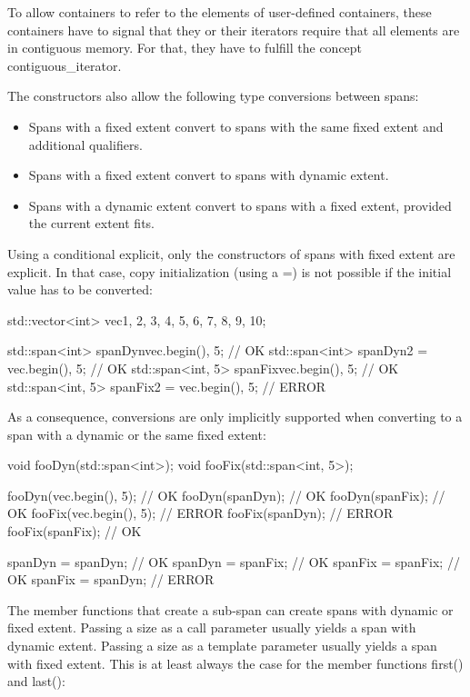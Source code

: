 To allow containers to refer to the elements of user-defined containers, these containers have to signal that they or their iterators require that all elements are in contiguous memory. For that, they have to fulfill the concept contiguous\_iterator.

The constructors also allow the following type conversions between spans:

\begin{itemize}
\item
Spans with a fixed extent convert to spans with the same fixed extent and additional qualifiers.

\item
Spans with a fixed extent convert to spans with dynamic extent.

\item
Spans with a dynamic extent convert to spans with a fixed extent, provided the current extent fits.
\end{itemize}

Using a conditional explicit, only the constructors of spans with fixed extent are explicit. In that case, copy initialization (using a =) is not possible if the initial value has to be converted:

\begin{cpp}
std::vector<int> vec{1, 2, 3, 4, 5, 6, 7, 8, 9, 10};

std::span<int> spanDyn{vec.begin(), 5}; // OK
std::span<int> spanDyn2 = {vec.begin(), 5}; // OK
std::span<int, 5> spanFix{vec.begin(), 5}; // OK
std::span<int, 5> spanFix2 = {vec.begin(), 5}; // ERROR
\end{cpp}

As a consequence, conversions are only implicitly supported when converting to a span with a dynamic or the same fixed extent:

\begin{cpp}
void fooDyn(std::span<int>);
void fooFix(std::span<int, 5>);

fooDyn({vec.begin(), 5}); // OK
fooDyn(spanDyn); // OK
fooDyn(spanFix); // OK
fooFix({vec.begin(), 5}); // ERROR
fooFix(spanDyn); // ERROR
fooFix(spanFix); // OK

spanDyn = spanDyn; // OK
spanDyn = spanFix; // OK
spanFix = spanFix; // OK
spanFix = spanDyn; // ERROR
\end{cpp}


The member functions that create a sub-span can create spans with dynamic or fixed extent. Passing a size as a call parameter usually yields a span with dynamic extent. Passing a size as a template parameter usually yields a span with fixed extent. This is at least always the case for the member functions first() and last():

